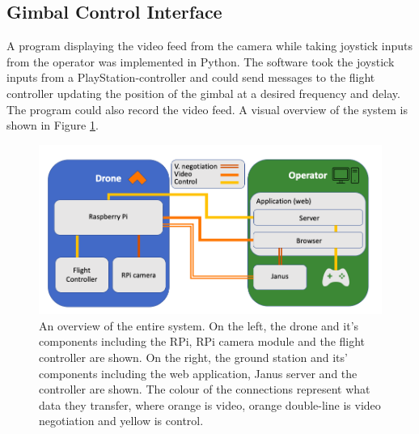 \documentclass[nofilelist]{cslthse-msc}
\begin{document}
\subsection{Gimbal Control Interface}
A program displaying the video feed from the camera while taking joystick inputs from the operator was implemented in Python. The software took the joystick inputs from a PlayStation-controller and could send messages to the flight controller updating the position of the gimbal at a desired frequency and delay. The program could also record the video feed. A visual overview of the system is shown in Figure \ref{fig:system-overview}.
\begin{figure}[!hbt]
   \centering
   \includegraphics[scale=0.5]{images/system-overview.png} 
   \caption{An overview of the entire system. On the left, the drone and it's components including the RPi, RPi camera module and the flight controller are shown. On the right, the ground station and its' components including the web application, Janus server and the controller are shown. The colour of the connections represent what data they transfer, where orange is video, orange double-line is video negotiation and yellow is control.}
   \label{fig:system-overview}
\end{figure}
\end{document}
